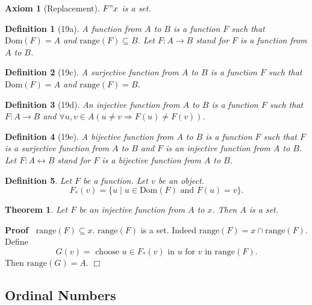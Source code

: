 \documentclass{article}
\newenvironment{forthel}{\begin{leftbar}}{\end{leftbar}}
\newenvironment{proof}{\noindent\textbf{Proof\ }}{\hspace*{\fill}$\Box$\medskip}
\newtheorem{axiom}{Axiom}
\newtheorem{theorem}{Theorem}
\newtheorem{definition}{Definition}
\newcommand{\urbild}[2]{{#1}_{*}({#2})}
\begin{document}
\begin{forthel}
\begin{axiom}[Replacement] $F"x$ is a set. \end{axiom}

\begin{definition}[19a]
A \emph{function from} $A$ \emph{to} $B$ is a function $F$ such that
$\mathrm{Dom}(F) = A$ and $\mathrm{range}(F) \subseteq B$.
Let $F : A \rightarrow B$ stand for $F$ is a function from
$A$ to $B$.
\end{definition}

\begin{definition}[19c]
A \emph{surjective function from} $A$ \emph{to} $B$ is a 
function $F$ such that $\mathrm{Dom}(F) = A$ and
$\mathrm{range}(F) = B$.
\end{definition}

\begin{definition}[19d] 
An \emph{injective function from} $A$ \emph{to} $B$ is a function $F$
such that $F : A \rightarrow B$ and
$\forall u,v \in A (u \neq v \Rightarrow F(u) \neq F(v))$.
\end{definition}

\begin{definition}[19e]
A \emph{bijective function from} $A$ to $B$ is a function $F$
such that $F$ is a surjective function from $A$ to $B$ and
$F$ is an injective function from $A$ to $B$.
Let $F : A \leftrightarrow B$ stand for $F$ is a 
bijective function from $A$ to $B$.
\end{definition}

\begin{definition} Let $F$ be a function. Let $v$ be an object.
$$\urbild{F}{v} = \{u \mid u \in \mathrm{Dom}(F) \text{ and } F(u) = v\}.$$
\end{definition}

\begin{theorem} Let $F$ be an injective function from $A$ to $x$.
Then $A$ is a set.
\end{theorem}
\begin{proof} $\mathrm{range}(F) \subseteq x$.
$\mathrm{range}(F)$ is a set. Indeed 
$\mathrm{range}(F) = x \cap \mathrm{range}(F)$.
Define $$G(v) = 
\text{ choose } u \in \urbild{F}{v} \text{ in } u \text{ for } v \text{ in } \mathrm{range}(F).$$
Then $\mathrm{range}(G) = A$.
\end{proof}
\end{forthel}

\subsection{Ordinal Numbers}
\end{document}
